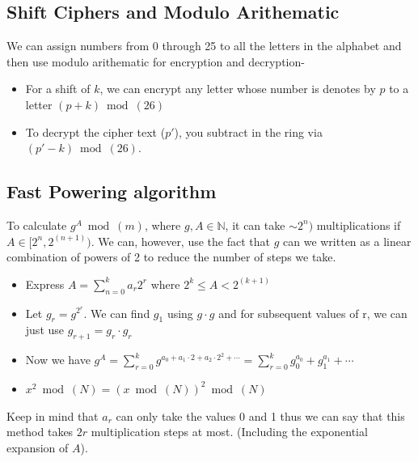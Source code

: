 	 	\subsection{Shift Ciphers and Modulo Arithematic}
	 		We can assign numbers from 0 through 25 to all the letters in the alphabet and then use modulo arithematic for encryption and decryption-
	 		\begin{itemize}
	 			\item For a shift of \(k\), we can encrypt any letter whose number is denotes by \(p\) to a letter \((p+k) \bmod(26)\)
	 			\item To decrypt the cipher text (\(p'\)), you subtract in the ring via \((p'-k) \bmod(26)\).
	 		\end{itemize}
	 	\subsection{Fast Powering algorithm}\label{subsec:fastexpo}
	 		To calculate \(g^A \bmod(m)\), where \(g, A \in \mathbb{N}\), it can take \(\sim 2^n)\) multiplications if \(A \in [2^n, 2^{(n+1)})\). We can, however, use the fact that $g$ can we written as a linear combination of powers of 2 to reduce the number of steps we take.
	 		\begin{itemize}
	 			\item Express \(A=\sum_{n=0}^{k}{a_r 2^r}\) where \(2^k \leq A < 2^{(k+1)}\)
	 			\item Let \(g_r = g^{2^r}\). We can find \(g_1\) using \(g \cdot g\) and for subsequent values of r, we can just use \(g_{r+1} = g_r \cdot g_r\)
	 			\item Now we have \(g^A = 
	 			\sum_{r=0}^{k}{g^{a_0 + a_1 \cdot 2 + a_2 \cdot 2^2 +\cdots}}=
	 			\sum_{r=0}^{k}{g_0^{a_0}+ g_1^{a_1} + \cdots}\)
	 			\item \(x^2 \bmod(N) = (x \bmod(N))^2 \bmod(N)\)
	 		\end{itemize}
	 		Keep in mind that \(a_r\) can only take the values 0 and 1 thus we can say that this method takes \(2r\) multiplication steps at most. (Including the exponential expansion of \(A\)).
	 \label{sec:prime}
